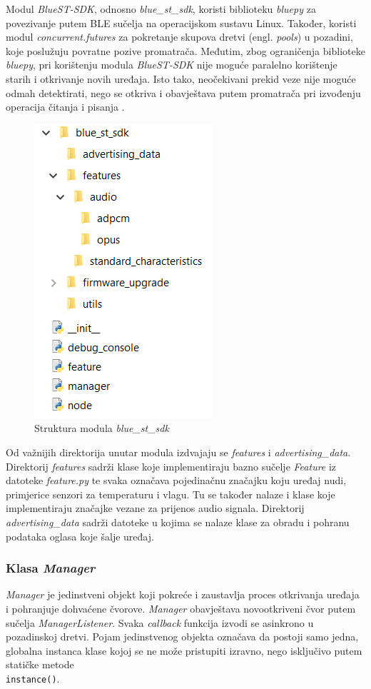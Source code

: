 Modul \textit{BlueST-SDK}, odnosno \textit{blue\_st\_sdk}, koristi biblioteku \textit{bluepy} za povezivanje putem BLE sučelja na operacijskom sustavu Linux. Također, koristi modul \textit{concurrent.futures} za pokretanje skupova dretvi (engl. \textit{pools}) u pozadini, koje poslužuju povratne pozive promatrača. Međutim, zbog ograničenja biblioteke \textit{bluepy}, pri korištenju modula \textit{BlueST-SDK} nije moguće paralelno korištenje starih i otkrivanje novih uređaja. Isto tako, neočekivani prekid veze nije moguće odmah detektirati, nego se otkriva i obavještava putem promatrača pri izvođenju operacija čitanja i pisanja \cite{bluest_py}. 

\begin{figure}[ht]
	\centering
	\includegraphics[scale=0.8]{imgs/sdk_folder_struct}
	\caption{Struktura modula \textit{blue\_st\_sdk}}
	\label{fig:sdk_folder_struct}
\end{figure}

Od važnijih direktorija unutar modula izdvajaju se \textit{features} i \textit{advertising\_data}. Direktorij \textit{features} sadrži klase koje implementiraju bazno sučelje \textit{Feature} iz datoteke \textit{feature.py} te svaka označava pojedinačnu značajku koju uređaj nudi, primjerice senzori za temperaturu i vlagu. Tu se također nalaze i klase koje implementiraju značajke vezane za prijenos audio signala. Direktorij \textit{advertising\_data} sadrži datoteke u kojima se nalaze klase za obradu i pohranu podataka oglasa koje šalje uređaj. 


\subsubsection{Klasa \textit{Manager}}
\textit{Manager} je jedinstveni objekt koji pokreće i zaustavlja proces otkrivanja uređaja i pohranjuje dohvaćene čvorove. \textit{Manager} obavještava novootkriveni čvor putem sučelja \textit{ManagerListener}. Svaka \textit{callback} funkcija izvodi se asinkrono u pozadinskoj dretvi. Pojam jedinstvenog objekta označava da postoji samo jedna, globalna instanca klase kojoj se ne može pristupiti izravno, nego isključivo putem statičke metode \\\lstinline|instance()|.

